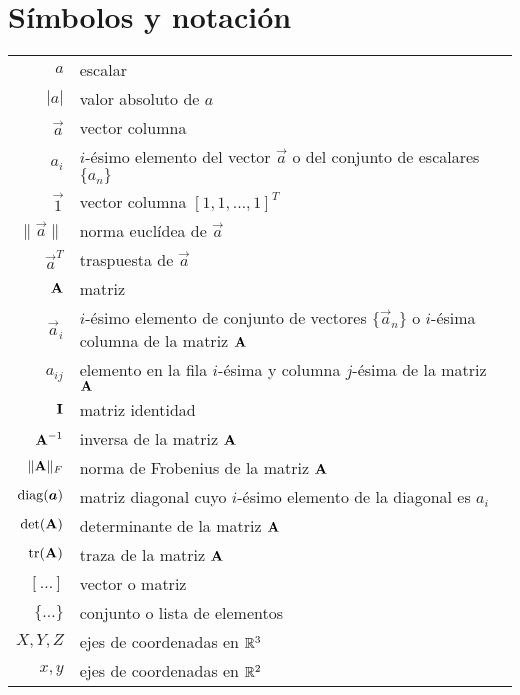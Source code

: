 \chapter*{Símbolos y notación}\label{notación}
\begin{longtable}{rp{}}
  $a$               & escalar \\
  $|a|$             & valor absoluto de $a$ \\
  $\vec{a}$         & vector columna \\
  $a_i$             & $i$-ésimo elemento del vector $\vec{a}$ o del conjunto
    de escalares $\{a_n\}$  \\
  $\vec{1}$         & vector columna $[1,1,\ldots,1]^T$ \\
  $\|\vec{a}\|$     & norma euclídea de $\vec{a}$  \\
  $\vec{a}^T$       & traspuesta de $\vec{a}$ \\
  $\mat{A}$         & matriz  \\
  $\vec{a}_i$       & $i$-ésimo elemento de conjunto de vectores $\{\vec{a}_n\}$
    o $i$-ésima columna de la matriz $\mat{A}$ \\
  $a_{ij}$          & elemento en la fila $i$-ésima y columna $j$-ésima de
    la matriz $\mat{A}$ \\
  $\mat{I}$         & matriz identidad \\
  $\mat{A}^{-1}$    & inversa de la matriz $\mat{A}$ \\
  $\|\mat{A}\|_F$   & norma de Frobenius de la matriz $\mat{A}$ \\
  $\operatorname*{diag}(\boldsymbol{a})$  & matriz diagonal cuyo $i$-ésimo elemento de la diagonal
    es $a_i$ \\
  $\det(\mat{A})$   & determinante de la matriz $\mat{A}$ \\
  $\trace(\mat{A})$ & traza de la matriz $\mat{A}$ \\
  $[\ldots]$        & vector o matriz \\
  $\{\ldots\}$      & conjunto o lista de elementos \\  
  $X, Y, Z$         & ejes de coordenadas en $\mathbb{R}^3$ \\
  $x, y$            & ejes de coordenadas en $\mathbb{R}^2$ \\

\end{longtable}
